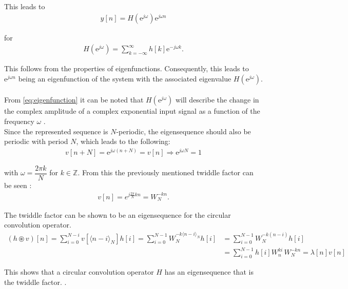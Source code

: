This leads to
\begin{align}\label{eq:eigenfunction}
y[n] = H(\text{e}^{j \omega}) \text{e}^{j\omega n}
\end{align}

for
\begin{align*}
H(\text{e}^{j\omega}) = \sum_{k=-\infty}^{\infty} h[k]\text{e}^{-j\omega k}.
\end{align*}

This follows from the properties of eigenfunctions. Consequently, this leads to $\text{e}^{j\omega n}$ being an eigenfunction of the system with the associated eigenvalue $H(\text{e}^{j\omega})$.
\\\\
From \eqref{eq:eigenfunction} it can be noted that $H(\text{e}^{j\omega})$ will describe the change in the complex amplitude of a complex exponential input signal as a function of the frequency $\omega$ \cite{DTSP}. 
\\
Since the represented sequence is $N$-periodic, the eigensequence should also be periodic with period $N$, which leads to the following:
\begin{align*}
v[n+N] = \text{e}^{j\omega (n+N)} = v[n] \Rightarrow \text{e}^{j\omega N} = 1
\end{align*}

with $\omega = \dfrac{2 \pi k}{N}$ for $k \in \mathbb{Z}$. From this the previously mentioned twiddle factor can be seen \cite{FSP}:
\begin{align*}
v[n] = e^{j\frac{2\pi}{N} kn} = W_N^{-kn}.
\end{align*}

The twiddle factor can be shown to be an eigensequence for the circular convolution operator.
\begin{align*}
	(h\circledast v)[n] 
	= \sum_{i=0}^{N-i} v[\langle n-i \rangle_N ]h[i] 
	= \sum_{i=0}^{N-1} W_N^{-k\langle n-i\rangle_N}h[i]
	&= \sum_{i=0}^{N-1} W_N^{-k(n-i)}h[i]\\
	&= \sum_{i=0}^{N-1} h[i] W_n^{ki} \, W_N^{-kn}
	= \lambda[n] v[n]
\end{align*}

This shows that a circular convolution operator $H$ has an eigensequence that is the twiddle factor. .